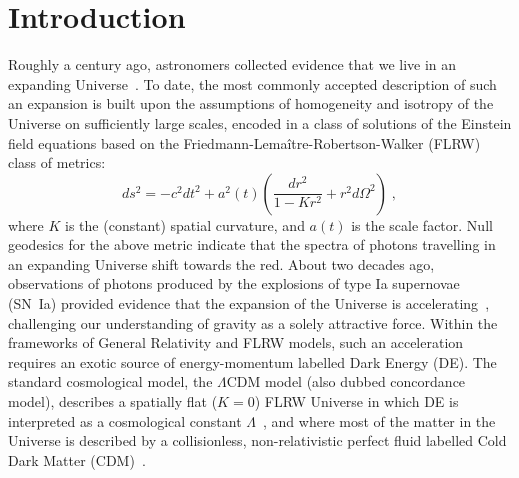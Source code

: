 \documentclass[notitlepage,nofootinbib]{revtex4-1}
\begin{document}
\maketitle

\section{Introduction}
Roughly a century ago, astronomers collected evidence that we live in an expanding Universe~\cite{1929PNAS...15..168H}. To date, the most commonly accepted description of such an expansion is built upon the assumptions of homogeneity and isotropy of the Universe on sufficiently large scales, encoded in a class of solutions of the Einstein field equations based on the Friedmann-Lema\^itre-Robertson-Walker (FLRW) class of metrics:
\begin{equation}\label{FLRWmetric}
    ds^2 = -c^2dt^2 + a^2(t)\left(\frac{dr^2}{1-Kr^2} + r^2 d\Omega^2\right)\;,
\end{equation}
where $K$ is the (constant) spatial curvature, and $a(t)$ is the scale factor. Null geodesics for the above metric indicate that the spectra of photons travelling in an expanding Universe shift towards the red. About two decades ago, observations of photons produced by the explosions of type Ia supernovae (SN~Ia) provided evidence that the expansion of the Universe is accelerating~\cite{SupernovaCosmologyProject:1998vns,SupernovaSearchTeam:1998fmf}, challenging our understanding of gravity as a solely attractive force. Within the frameworks of General Relativity and FLRW models, such an acceleration requires an exotic source of energy-momentum labelled Dark Energy (DE). The standard cosmological model, the $\Lambda$CDM model (also dubbed concordance model), describes a spatially flat ($K=0$) FLRW Universe in which DE is interpreted as a cosmological constant $\Lambda$~\cite{Carroll:2000fy}, and where most of the matter in the Universe is described by a collisionless, non-relativistic perfect fluid labelled Cold Dark Matter (CDM)~\cite{Profumo:2019ujg}. 
\end{document}
